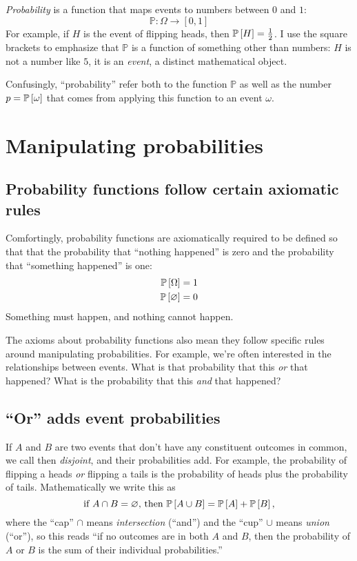 \emph{Probability} is a function that maps events to numbers between $0$ and
$1$:
\begin{equation*}
\mathbb{P} : \Omega \to [0, 1]
\end{equation*}
For example, if $H$ is the event of flipping heads, then $\mathbb{P}\left[{H}\right] =
\tfrac{1}{2}$. I use the square brackets to emphasize that $\mathbb{P}$ is a
function of something other than numbers: $H$ is not a number like $5$, it is
an \emph{event}, a distinct mathematical object.

Confusingly, ``probability'' refer both to the function $\mathbb{P}$ as well as
the number $p = \mathbb{P}\left[{\omega}\right]$ that comes from applying this function to an
event $\omega$.


\section{Manipulating probabilities}

\subsection{Probability functions follow certain axiomatic rules}

Comfortingly, probability functions are axiomatically required to be defined so
that that the probability that ``nothing happened'' is zero and the probability
that ``something happened'' is one:
\begin{align*}
\mathbb{P}\left[{\Omega}\right] &= 1 \\
\mathbb{P}\left[{\varnothing}\right] &= 0
\end{align*}
Something must happen, and nothing cannot happen.

The axioms about probability functions also mean they follow specific rules
around manipulating probabilities. For example, we're often interested in the
relationships between events. What is that probability that this \emph{or} that
happened? What is the probability that this \emph{and} that happened?

\subsection{``Or'' adds event probabilities}

If $A$ and $B$ are two events that don't have any constituent outcomes in
common, we call then \emph{disjoint}, and their probabilities add. For example,
the probability of flipping a heads \emph{or} flipping a tails is the
probability of heads plus the probability of tails.  Mathematically we write
this as
$$
\text{if } A \cap B = \varnothing \text{, then } \mathbb{P}\left[{A \cup B}\right] = \mathbb{P}\left[{A}\right] + \mathbb{P}\left[{B}\right],
$$
where the ``cap'' $\cap$ means \emph{intersection} (``and'') and the ``cup'' $\cup$ means
\emph{union} (``or''), so this reads ``if no outcomes are in both $A$ and $B$,
then the probability of $A$ or $B$ is the sum of their individual probabilities.''


